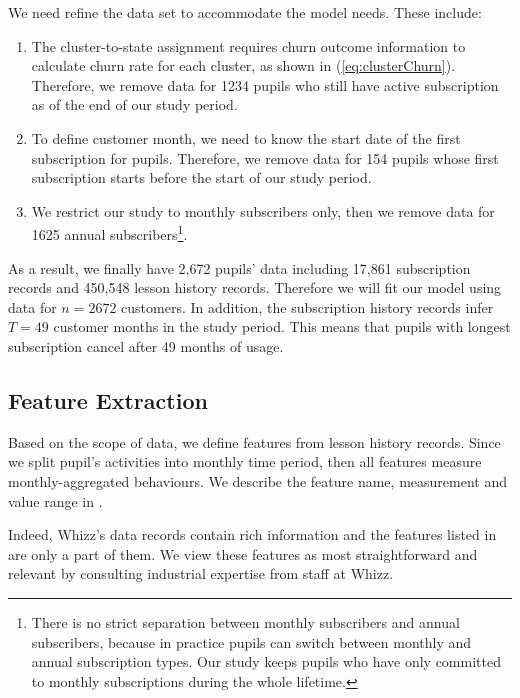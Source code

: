 We need refine the data set to accommodate the model needs. These include:
\begin{enumerate}
\item The cluster-to-state assignment requires churn outcome information to calculate churn rate for each cluster, as shown in (\ref{eq:clusterChurn}). Therefore, we remove data for 1234 pupils who still have active subscription as of the end of our study period.
\item To define customer month, we need to know the start date of the first subscription for pupils. Therefore, we remove data for 154 pupils whose first subscription starts before the start of our study period.
\item We restrict our study to monthly subscribers only, then we remove data for 1625 annual subscribers\footnote{There is no strict separation between monthly subscribers and annual subscribers, because in practice pupils can switch between monthly and annual subscription types. Our study keeps pupils who have only committed to monthly subscriptions during the whole lifetime.}. 
\end{enumerate}
As a result, we finally have 2,672 pupils' data including 17,861 subscription records and 450,548 lesson history records. Therefore we will fit our model using data for $n=2672$ customers. In addition, the subscription history records infer $T=49$ customer months in the study period. This means that pupils with longest subscription cancel after 49 months of usage.

\subsection{Feature Extraction}

Based on the scope of data, we define features from lesson history records. Since we split pupil's activities into monthly time period, then all features measure monthly-aggregated behaviours. We describe the feature name, measurement and value range in .

Indeed, Whizz's data records contain rich information and the features listed in  are only a part of them. We view these features as most straightforward and relevant by consulting industrial expertise from staff at Whizz.

